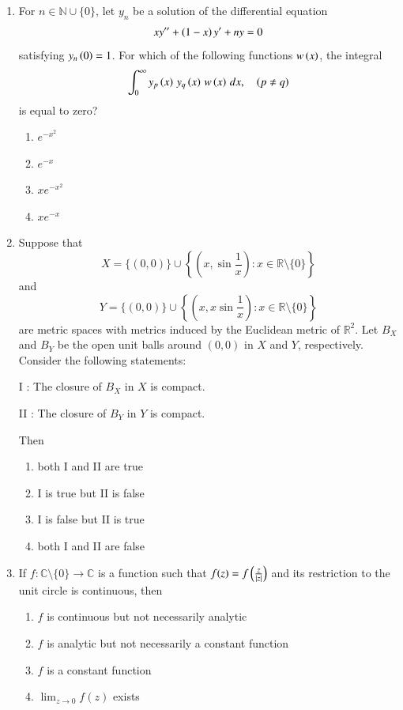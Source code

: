 \documentclass[journal,12pt,onecolumn]{IEEEtran}
\theoremstyle{remark}
\begin{document}
\begin{enumerate}[start=1, label=Q.\arabic*]
\hfill{}

\item For $n \in \mathbb{N} \cup \{0\}$, let $y_n$ be a solution of the differential equation
\begin{align*}
x y'' + \left(1 - x\right) y' + n y = 0
\end{align*}
satisfying $y_n\left(0\right)=1$. For which of the following functions $w\left(x\right)$, the integral
\[
\int_{0}^{\infty} y_p\left(x\right)\, y_q\left(x\right)\, w\left(x\right)\, dx,\quad \left(p \ne q\right)
\]
is equal to zero?
\begin{enumerate}
\item $e^{-x^{2}}$
\item $e^{-x}$
\item $x e^{-x^{2}}$
\item $x e^{-x}$
\end{enumerate}

\hfill{}
\item Suppose that 
\[
X = \{(0,0)\} \cup \left\{\left(x,\sin \frac{1}{x}\right) : x \in \mathbb{R}\setminus\{0\}\right\}
\]
and
\[
Y = \{(0,0)\} \cup \left\{\left(x, x \sin \frac{1}{x}\right) : x \in \mathbb{R}\setminus\{0\}\right\}
\]
are metric spaces with metrics induced by the Euclidean metric of $\mathbb{R}^2$. Let $B_X$ and $B_Y$ be the open unit balls around $(0,0)$ in $X$ and $Y$, respectively. Consider the following statements:  

I : The closure of $B_X$ in $X$ is compact.  

II : The closure of $B_Y$ in $Y$ is compact.  

Then
\begin{enumerate}
\item both I and II are true
\item I is true but II is false
\item I is false but II is true
\item both I and II are false
\end{enumerate}

\hfill{}


\item If $f : \mathbb{C}\setminus \{0\} \to \mathbb{C}$ is a function such that $f(z) = f\left(\tfrac{z}{|z|}\right)$ and its restriction to the unit circle is continuous, then
\begin{enumerate}
\item $f$ is continuous but not necessarily analytic
\item $f$ is analytic but not necessarily a constant function
\item $f$ is a constant function
\item $\lim_{z\to 0} f(z)$ exists
\end{enumerate}


\end{enumerate}
\end{document}
